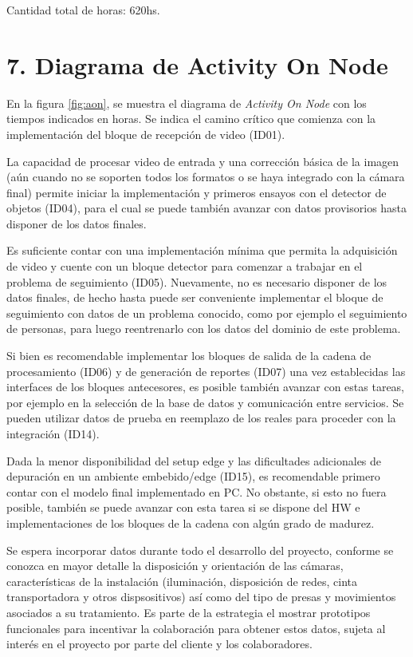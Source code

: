 \documentclass[11pt]{charter}
\begin{document}
Cantidad total de horas: 620hs.

\section{7. Diagrama de Activity On Node}
\label{sec:AoN}

En la figura \ref{fig:aon}, se muestra el diagrama de {\em Activity On Node} con los tiempos indicados en horas. Se indica el camino crítico que comienza con la implementación del bloque de recepción de video (ID01). 

La capacidad de procesar video de entrada y una corrección básica de la imagen (aún cuando no se soporten todos los formatos o se haya integrado con la cámara final) permite iniciar la implementación y primeros ensayos con el detector de objetos (ID04), para el cual se puede también avanzar con datos provisorios hasta disponer de los datos finales.

Es suficiente contar con una implementación mínima que permita la adquisición de video y cuente con un bloque detector para comenzar a trabajar en el problema de seguimiento (ID05). Nuevamente, no es necesario disponer de los datos finales, de hecho hasta puede ser conveniente implementar el bloque de seguimiento con datos de un problema conocido, como por ejemplo el seguimiento de personas, para luego reentrenarlo con los datos del dominio de este problema.

Si bien es recomendable implementar los bloques de salida de la cadena de procesamiento (ID06) y de generación de reportes (ID07) una vez establecidas las interfaces de los bloques antecesores, es posible también avanzar con estas tareas, por ejemplo en la selección de la base de datos y comunicación entre servicios. Se pueden utilizar datos de prueba en reemplazo de los reales para proceder con la integración (ID14).

Dada la menor disponibilidad del setup edge y las dificultades adicionales de depuración en un ambiente embebido/edge (ID15), es recomendable primero contar con el modelo final implementado en PC. No obstante, si esto no fuera posible, también se puede avanzar con esta tarea si se dispone del HW e implementaciones de los bloques de la cadena con algún grado de madurez.

Se espera incorporar datos durante todo el desarrollo del proyecto, conforme se conozca en mayor detalle la disposición y orientación de las cámaras, características de la instalación (iluminación, disposición de redes, cinta transportadora y otros dispsositivos) así como del tipo de presas y movimientos asociados a su tratamiento. Es parte de la estrategia el mostrar prototipos funcionales para incentivar la colaboración para obtener estos datos, sujeta al interés en el proyecto por parte del cliente y los colaboradores.
\end{document}
